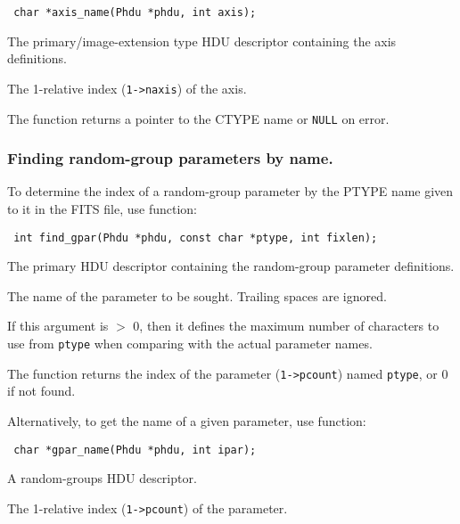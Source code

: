 \label{axis_name}\begin{verbatim}
 char *axis_name(Phdu *phdu, int axis);
\end{verbatim}

\begin{arglist}

  The primary/image-extension type HDU descriptor
                    containing the axis definitions.

  The 1-relative index (\verb`1->naxis`) of the
                    axis.
\end{arglist}

The function returns a pointer to the CTYPE name or \verb`NULL` on error.

\subsubsection{Finding random-group parameters by name.}

To determine the index of a random-group parameter by the PTYPE name
given to it in the FITS file, use function:

\label{find_gpar}\begin{verbatim}
 int find_gpar(Phdu *phdu, const char *ptype, int fixlen);
\end{verbatim}

\begin{arglist}

  The primary HDU descriptor containing the
                    random-group parameter definitions.

 The name of the parameter to be sought. Trailing
                    spaces are ignored.

 If this argument is $>$ 0, then it defines the maximum
               number of characters to use from \verb`ptype` when
               comparing with the actual parameter names.
\end{arglist}

The function returns the index of the parameter (\verb`1->pcount`) named
\verb`ptype`, or 0 if not found.

Alternatively, to get the name of a given parameter, use function:

\label{gpar_name}\begin{verbatim}
 char *gpar_name(Phdu *phdu, int ipar);
\end{verbatim}

\begin{arglist}

  A random-groups HDU descriptor.

  The 1-relative index (\verb`1->pcount`) of the
                    parameter.
\end{arglist}

